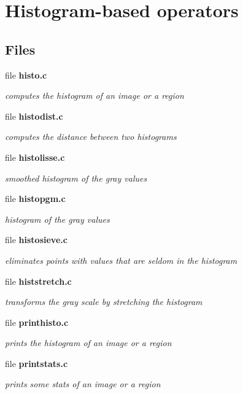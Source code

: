 \section{Histogram-based operators}
\label{group__histo}
\subsection*{Files}
\begin{CompactItemize}
\item 
file \bf{histo.c}
\begin{CompactList}\small\item\em computes the histogram of an image or a region \item\end{CompactList}

\item 
file \bf{histodist.c}
\begin{CompactList}\small\item\em computes the distance between two histograms \item\end{CompactList}

\item 
file \bf{histolisse.c}
\begin{CompactList}\small\item\em smoothed histogram of the gray values \item\end{CompactList}

\item 
file \bf{histopgm.c}
\begin{CompactList}\small\item\em histogram of the gray values \item\end{CompactList}

\item 
file \bf{histosieve.c}
\begin{CompactList}\small\item\em eliminates points with values that are seldom in the histogram \item\end{CompactList}

\item 
file \bf{histstretch.c}
\begin{CompactList}\small\item\em transforms the gray scale by stretching the histogram \item\end{CompactList}

\item 
file \bf{printhisto.c}
\begin{CompactList}\small\item\em prints the histogram of an image or a region \item\end{CompactList}

\item 
file \bf{printstats.c}
\begin{CompactList}\small\item\em prints some stats of an image or a region \item\end{CompactList}

\end{CompactItemize}
